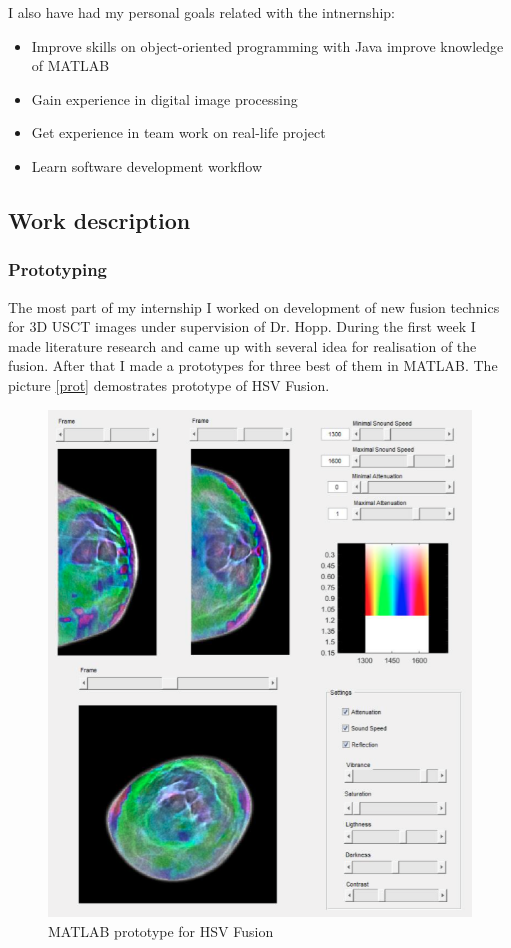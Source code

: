 \documentclass[english]{article}
\begin{document}
I also have had my personal goals related with the intnernship:
\begin{itemize}
\item Improve skills on object-oriented programming with Java improve knowledge of MATLAB
\item Gain experience in digital image processing
\item Get experience in team work on real-life project
\item Learn software development workflow
\end{itemize}

\subsection{Work description}
\subsubsection{Prototyping}

The most part of my internship I worked on development of new fusion technics for 3D USCT images under supervision of Dr. Hopp. During the first week I made literature research and came up with several idea for realisation of the fusion. After that I made a prototypes for three best of them in MATLAB. The picture \ref{prot} demostrates prototype of HSV Fusion.\\

\begin{figure}[H]
\centerline{\includegraphics[scale=0.4]{internship_report/pro}}
\caption{MATLAB prototype for HSV Fusion\label{fig:pro}}
\end{figure}
\end{document}
